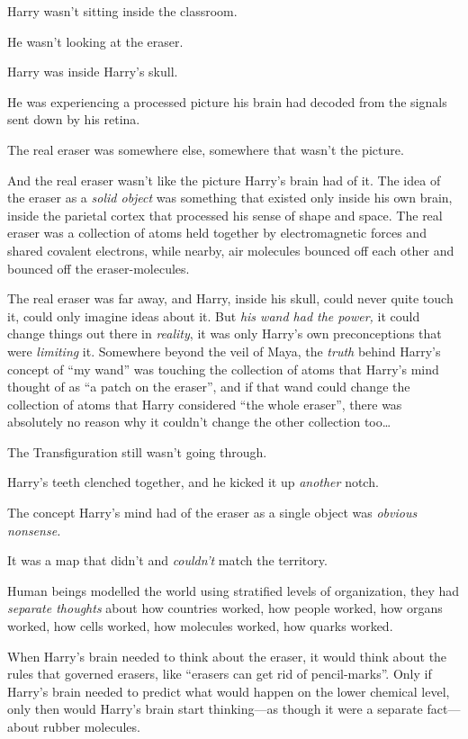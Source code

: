 Harry wasn’t sitting inside the classroom.

He wasn’t looking at the eraser.

Harry was inside Harry’s skull.

He was experiencing a processed picture his brain had decoded from the signals sent down by his retina.

The real eraser was somewhere else, somewhere that wasn’t the picture.

And the real eraser wasn’t like the picture Harry’s brain had of it. The idea of the eraser as a \emph{solid object} was something that existed only inside his own brain, inside the parietal cortex that processed his sense of shape and space. The real eraser was a collection of atoms held together by electromagnetic forces and shared covalent electrons, while nearby, air molecules bounced off each other and bounced off the eraser-molecules.

The real eraser was far away, and Harry, inside his skull, could never quite touch it, could only imagine ideas about it. But \emph{his wand had the power,} it could change things out there in \emph{reality}, it was only Harry’s own preconceptions that were \emph{limiting} it. Somewhere beyond the veil of Maya, the \emph{truth} behind Harry’s concept of “my wand” was touching the collection of atoms that Harry’s mind thought of as “a patch on the eraser”, and if that wand could change the collection of atoms that Harry considered “the whole eraser”, there was absolutely no reason why it couldn’t change the other collection too…

The Transfiguration still wasn’t going through.

Harry’s teeth clenched together, and he kicked it up \emph{another} notch.

The concept Harry’s mind had of the eraser as a single object was \emph{obvious nonsense.}

It was a map that didn’t and \emph{couldn’t} match the territory.

Human beings modelled the world using stratified levels of organization, they had \emph{separate thoughts} about how countries worked, how people worked, how organs worked, how cells worked, how molecules worked, how quarks worked.

When Harry’s brain needed to think about the eraser, it would think about the rules that governed erasers, like “erasers can get rid of pencil-marks”. Only if Harry’s brain needed to predict what would happen on the lower chemical level, only then would Harry’s brain start thinking—as though it were a separate fact—about rubber molecules.

